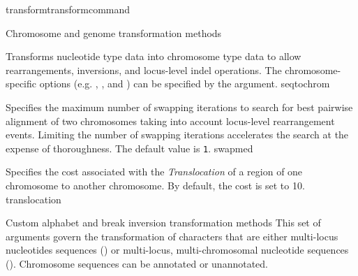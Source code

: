 \begin{command}{transform}{transformcommand}
\begin{arguments}
\begin{argumentgroup}{Chromosome and genome transformation methods}
\begin{description}
                        
%                         
          	 {Transforms nucleotide type data into chromosome type data to allow
           	 rearrangements, inversions, and locus-level indel operations.  The
            	chromosome-specific options (e.g.  , 
            	, %
		and ) can be specified by the argument.}
                	     {seqtochrom}
           
                        {Specifies the maximum number of swapping iterations
                        to search for best pairwise alignment of two chromosomes
                        taking into account locus-level rearrangement events. 
                        Limiting the number of swapping
                        iterations accelerates the search at the expense of
                        thoroughness. The default value is \texttt{1}.}
                        {swapmed}
                        
                        {Specifies the cost associated with the \emph{Translocation} of a region of one 
			chromosome to another chromosome.  By default, the cost is set to 10.}
			{translocation}
			
               \end{description}
        \end{argumentgroup}
        
\begin{argumentgroup}{Custom alphabet and break inversion transformation methods}   
     	This set of arguments govern the transformation of characters that are either multi-locus nucleotides 
	sequences () or multi-locus, multi-chromosomal nucleotide
	sequences ().  Chromosome sequences can be \poyargument
	{annotated} or unannotated.
	

\end{argumentgroup}
\end{arguments}
\end{command}
